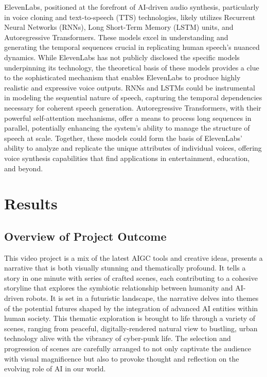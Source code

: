 \documentclass[11pt,a4paper,oneside]{report}
\begin{document}
ElevenLabs, positioned at the forefront of AI-driven audio synthesis, particularly in voice cloning and text-to-speech (TTS) technologies, likely utilizes Recurrent Neural Networks (RNNs), Long Short-Term Memory (LSTM) units, and Autoregressive Transformers. 
These models excel in understanding and generating the temporal sequences crucial in replicating human speech's nuanced dynamics. 
While ElevenLabs has not publicly disclosed the specific models underpinning its technology, the theoretical basis of these models provides a clue to the sophisticated mechanism that enables ElevenLabs to produce highly realistic and expressive voice outputs. 
RNNs and LSTMs could be instrumental in modeling the sequential nature of speech, capturing the temporal dependencies necessary for coherent speech generation. 
Autoregressive Transformers, with their powerful self-attention mechanisms, offer a means to process long sequences in parallel, potentially enhancing the system's ability to manage the structure of speech at scale. 
Together, these models could form the basis of ElevenLabs’ ability to analyze and replicate the unique attributes of individual voices, offering voice synthesis capabilities that find applications in entertainment, education, and beyond.


\chapter{Results}
\label{results}
\section{Overview of Project Outcome}

This video project is a mix of the latest AIGC tools and creative ideas, presents a narrative that is both visually stunning and thematically profound. 
It tells a story in one minute with series of crafted scenes, each contributing to a cohesive storyline that explores the symbiotic relationship between humanity and AI-driven robots.
It is set in a futuristic landscape, the narrative delves into themes of the potential futures shaped by the integration of advanced AI entities within human society. 
This thematic exploration is brought to life through a variety of scenes, ranging from peaceful, digitally-rendered natural view to bustling, urban technology alive with the vibrancy of cyber-punk life. 
The selection and progression of scenes are carefully arranged to not only captivate the audience with visual magnificence but also to provoke thought and reflection on the evolving role of AI in our world.
\end{document}
